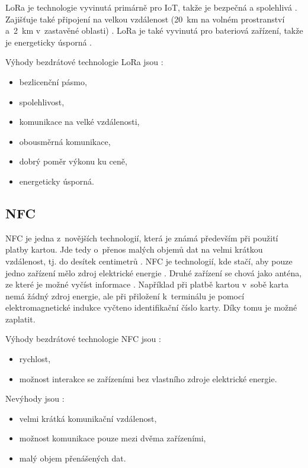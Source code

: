 LoRa je technologie vyvinutá primárně pro IoT, takže je bezpečná a spolehlivá \cite{LoRa_IoT_PORT}. Zajišťuje také připojení na velkou vzdálenost (20~km na 
volném prostranství a~2~km v~zastavěné oblasti) \cite{LoRa_IoT_PORT}. LoRa je také vyvinutá pro bateriová zařízení, takže je energeticky 
úsporná \cite{LoRa_IoT_PORT}.

Výhody bezdrátové technologie LoRa jsou \cite{LoRa_IoT_PORT}:
\begin{itemize}
  \item bezlicenční pásmo,
  \item spolehlivost,
  \item komunikace na velké vzdálenosti,
  \item obousměrná komunikace,
  \item dobrý poměr výkonu ku ceně,
  \item energeticky úsporná.
\end{itemize}

\subsection{NFC}
NFC je jedna z~novějších technologií, která je známá především při použití platby kartou. Jde tedy o~přenos malých objemů dat na velmi krátkou 
vzdálenost, tj. do desítek centimetrů \cite{Bezdrat_muni}. NFC je technologií, kde stačí, aby pouze jedno zařízení mělo zdroj elektrické 
energie \cite{Bezdrat_muni}. Druhé zařízení se chová jako anténa, ze které je možné vyčíst informace \cite{Bezdrat_muni}. Například při 
platbě kartou v~sobě karta nemá žádný zdroj energie, ale při přiložení k~terminálu je pomocí elektromagnetické indukce vyčteno identifikační
číslo karty. Díky tomu je možné zaplatit. 

Výhody bezdrátové technologie NFC jsou \cite{Bezdrat_muni}:
\begin{itemize}
  \item rychlost,
  \item možnost interakce se zařízeními bez vlastního zdroje elektrické energie.
\end{itemize}

Nevýhody jsou \cite{Bezdrat_muni}:
\begin{itemize}
  \item velmi krátká komunikační vzdálenost,
  \item možnost komunikace pouze mezi dvěma zařízeními, 
  \item malý objem přenášených dat.
\end{itemize}

